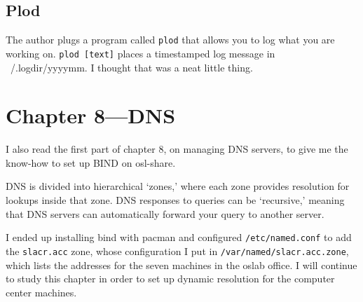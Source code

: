 \documentclass{article}
\begin{document}
\subsection*{Plod}

The author plugs a program called \texttt{plod} that allows you to log what you
are working on. \texttt{plod [text]} places a timestamped log message in
~/.logdir/yyyymm. I thought that was a neat little thing.

\section*{Chapter 8---DNS}

I also read the first part of chapter 8, on managing DNS servers, to give me
the know-how to set up BIND on osl-share. 

DNS is divided into hierarchical `zones,' where each zone provides resolution
for lookups inside that zone. DNS responses to queries can be `recursive,'
meaning that DNS servers can automatically forward your query to another
server. 

I ended up installing bind with pacman and configured \texttt{/etc/named.conf}
to add the \texttt{slacr.acc} zone, whose configuration I put in
\texttt{/var/named/slacr.acc.zone}, which lists the addresses for the seven
machines in the oslab office. I will continue to study this chapter in order to
set up dynamic resolution for the computer center machines.
\end{document}
